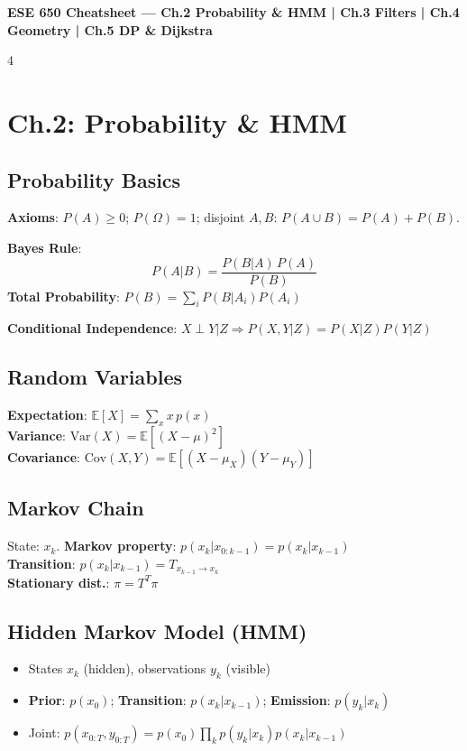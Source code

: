 \documentclass[8pt,landscape]{article}
\begin{document}
\begin{center}
  {\normalsize\bfseries ESE 650 Cheatsheet --- Ch.2 Probability \& HMM | Ch.3 Filters | Ch.4 Geometry | Ch.5 DP \& Dijkstra}
\end{center}
\vspace{-4pt}
\begin{multicols}{4}

\section{Ch.2: Probability \& HMM}

\subsection{Probability Basics}
\textbf{Axioms}: $P(A)\ge0$; $P(\Omega)=1$; disjoint $A,B$: $P(A\cup B)=P(A)+P(B)$.

\textbf{Bayes Rule}:
\[ P(A|B) = \frac{P(B|A)\,P(A)}{P(B)} \]
\textbf{Total Probability}: $P(B)=\sum_i P(B|A_i)P(A_i)$

\textbf{Conditional Independence}: $X\perp Y|Z \Rightarrow P(X,Y|Z)=P(X|Z)P(Y|Z)$

\subsection{Random Variables}
\textbf{Expectation}: $\mathbb{E}[X]=\sum_x x\,p(x)$\\
\textbf{Variance}: $\text{Var}(X)=\mathbb{E}[(X-\mu)^2]$\\
\textbf{Covariance}: $\text{Cov}(X,Y)=\mathbb{E}[(X-\mu_X)(Y-\mu_Y)]$

\subsection{Markov Chain}
State: $x_k$. \textbf{Markov property}: $p(x_k|x_{0:k-1})=p(x_k|x_{k-1})$\\
\textbf{Transition}: $p(x_k|x_{k-1})=T_{x_{k-1}\to x_k}$\\
\textbf{Stationary dist.}: $\pi = T^T \pi$

\subsection{Hidden Markov Model (HMM)}
\begin{itemize}
  \item States $x_k$ (hidden), observations $y_k$ (visible)
  \item \textbf{Prior}: $p(x_0)$; \textbf{Transition}: $p(x_k|x_{k-1})$; \textbf{Emission}: $p(y_k|x_k)$
  \item Joint: $p(x_{0:T},y_{0:T})=p(x_0)\prod_k p(y_k|x_k)p(x_k|x_{k-1})$
\end{itemize}


\end{multicols}
\end{document}
